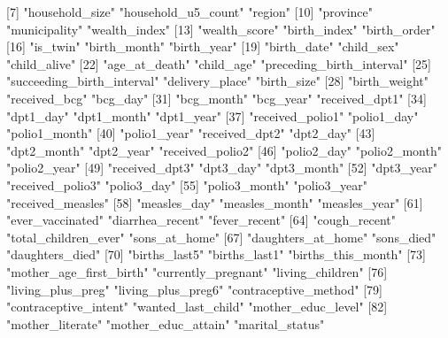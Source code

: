   [7] "household_size"                "household_u5_count"            "region"                       
 [10] "province"                      "municipality"                  "wealth_index"                 
 [13] "wealth_score"                  "birth_index"                   "birth_order"                  
 [16] "is_twin"                       "birth_month"                   "birth_year"                   
 [19] "birth_date"                    "child_sex"                     "child_alive"                  
 [22] "age_at_death"                  "child_age"                     "preceding_birth_interval"     
 [25] "succeeding_birth_interval"     "delivery_place"                "birth_size"                   
 [28] "birth_weight"                  "received_bcg"                  "bcg_day"                      
 [31] "bcg_month"                     "bcg_year"                      "received_dpt1"                
 [34] "dpt1_day"                      "dpt1_month"                    "dpt1_year"                    
 [37] "received_polio1"               "polio1_day"                    "polio1_month"                 
 [40] "polio1_year"                   "received_dpt2"                 "dpt2_day"                     
 [43] "dpt2_month"                    "dpt2_year"                     "received_polio2"              
 [46] "polio2_day"                    "polio2_month"                  "polio2_year"                  
 [49] "received_dpt3"                 "dpt3_day"                      "dpt3_month"                   
 [52] "dpt3_year"                     "received_polio3"               "polio3_day"                   
 [55] "polio3_month"                  "polio3_year"                   "received_measles"             
 [58] "measles_day"                   "measles_month"                 "measles_year"                 
 [61] "ever_vaccinated"               "diarrhea_recent"               "fever_recent"                 
 [64] "cough_recent"                  "total_children_ever"           "sons_at_home"                 
 [67] "daughters_at_home"             "sons_died"                     "daughters_died"               
 [70] "births_last5"                  "births_last1"                  "births_this_month"            
 [73] "mother_age_first_birth"        "currently_pregnant"            "living_children"              
 [76] "living_plus_preg"              "living_plus_preg6"             "contraceptive_method"         
 [79] "contraceptive_intent"          "wanted_last_child"             "mother_educ_level"            
 [82] "mother_literate"               "mother_educ_attain"            "marital_status"               
